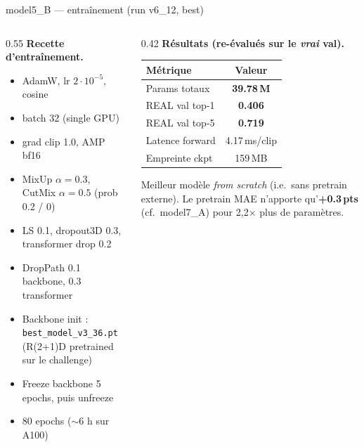 \documentclass[10pt,aspectratio=169]{beamer}
\newcommand{\hl}[1]{\textcolor{accent}{\textbf{#1}}}
\newcommand{\good}[1]{\textcolor{good}{\textbf{#1}}}
\begin{document}
\begin{frame}{model5\_B --- entraînement (run v6\_12, best)}
  \begin{columns}[T,onlytextwidth]
    \begin{column}{0.55\textwidth}
      \textbf{Recette d'entraînement.}
      \begin{itemize}
        \footnotesize
        \item AdamW, lr $2\!\cdot\!10^{-5}$, cosine
        \item batch 32 (single GPU)
        \item grad clip 1.0, AMP bf16
        \item MixUp $\alpha{=}0.3$, CutMix $\alpha{=}0.5$ (prob 0.2 / 0)
        \item LS 0.1, dropout3D 0.3, transformer drop 0.2
        \item DropPath 0.1 backbone, 0.3 transformer
        \item Backbone init : \texttt{best\_model\_v3\_36.pt} (R(2+1)D pretrained sur le challenge)
        \item Freeze backbone 5 epochs, puis unfreeze
        \item 80 epochs ($\sim$6 h sur A100)
      \end{itemize}
    \end{column}
    \begin{column}{0.42\textwidth}
      \textbf{Résultats (re-évalués sur le \emph{vrai} val).}
      \begin{center}
        \begin{tabular}{l c}
          \toprule
          Métrique & Valeur \\
          \midrule
          Params totaux       & \good{39.78\,M} \\
          REAL val top-1      & \good{0.406} \\
          REAL val top-5      & \good{0.719} \\
          Latence forward     & 4.17\,ms/clip \\
          Empreinte ckpt      & 159\,MB \\
          \bottomrule
        \end{tabular}
      \end{center}

      \medskip
      \footnotesize
      Meilleur modèle \emph{from scratch} (i.e.\ sans pretrain externe). Le pretrain MAE n'apporte qu'\hl{+0.3\,pts} (cf.\ model7\_A) pour 2,2$\times$ plus de paramètres.
    \end{column}
  \end{columns}
\end{frame}
\end{document}
